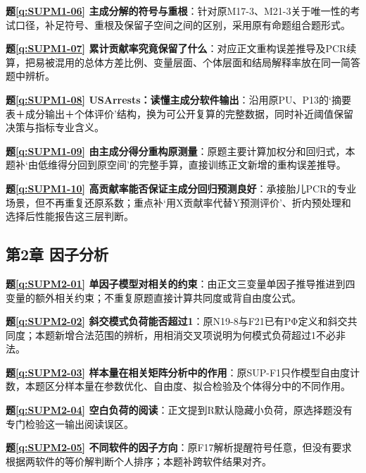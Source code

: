 \noindent\textbf{题\ref*{q:SUPM1-06} 主成分解的符号与重根}：针对原M17-3、M21-3关于唯一性的考试口径，补足符号、重根及保留子空间之间的区别，采用原有命题组合题形式。\par

\noindent\textbf{题\ref*{q:SUPM1-07} 累计贡献率究竟保留了什么}：对应正文重构误差推导及PCR续算，把易被混用的总体方差比例、变量层面、个体层面和结局解释率放在同一简答题中辨析。\par

\noindent\textbf{题\ref*{q:SUPM1-08} USArrests：读懂主成分软件输出}：沿用原PU、P13的‘摘要表＋成分输出＋个体评价’结构，换为可公开复算的完整数据，同时补近阈值保留决策与指标专业含义。\par

\noindent\textbf{题\ref*{q:SUPM1-09} 由主成分得分重构原测量}：原题主要计算加权分和回归式，本题补‘由低维得分回到原空间’的完整手算，直接训练正文新增的重构误差推导。\par

\noindent\textbf{题\ref*{q:SUPM1-10} 高贡献率能否保证主成分回归预测良好}：承接胎儿PCR的专业场景，但不再重复还原系数；重点补‘用X贡献率代替Y预测评价’、折内预处理和选择后性能报告这三层判断。\par

\subsection*{第2章 因子分析}

\noindent\textbf{题\ref*{q:SUPM2-01} 单因子模型对相关的约束}：由正文三变量单因子推导推进到四变量的额外相关约束；不重复原题直接计算共同度或背自由度公式。\par

\noindent\textbf{题\ref*{q:SUPM2-02} 斜交模式负荷能否超过1}：原N19-8与F21已有PΦ定义和斜交共同度；本题新增合法范围的辨析，用相消交叉项说明为何模式负荷超过1不必非法。\par

\noindent\textbf{题\ref*{q:SUPM2-03} 样本量在相关矩阵分析中的作用}：原SUP-F1只作模型自由度计数，本题区分样本量在参数优化、自由度、拟合检验及个体得分中的不同作用。\par

\noindent\textbf{题\ref*{q:SUPM2-04} 空白负荷的阅读}：正文提到R默认隐藏小负荷，原选择题没有专门检验这一输出阅读误区。\par

\noindent\textbf{题\ref*{q:SUPM2-05} 不同软件的因子方向}：原F17解析提醒符号任意，但没有要求根据两软件的等价解判断个人排序；本题补跨软件结果对齐。\par

